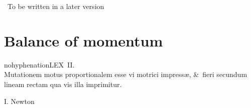 \documentclass[a4paper,12pt,%
onecolumn,oneside,%
british%
]{memoir}
\newcommand{\langnohyph}[1]{\begin{hyphenrules}{nohyphenation}#1\end{hyphenrules}}
\newcommand*{\amp}{\&}
\newcommand{\mynotew}[1]{{\footnotesize\color{midgrey}\faIcon{tools}\ #1}}
\renewcommand*{\|}[1][]{\nonscript\:#1\vert\nonscript\:\mathopen{}}
\begin{document}
\mynotew{To be written in a later version}


\printpagenotes*
\clearpage
\chapter{Balance of momentum}
\label{cha:bal_momentum}


\epigraph{\centering\langnohyph{LEX~II.\\
Mutationem motus proportionalem esse vi motrici impress{\ae}, \amp\ fieri secundum lineam rectam qua vis illa imprimitur.}}{I. Newton \cites*{newton1687}}

%
\end{document}
